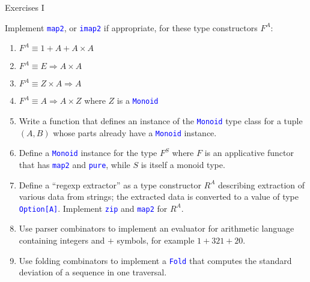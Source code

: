 \documentclass[english]{beamer}
\begin{document}
\begin{frame}{Exercises I }

Implement \texttt{\textcolor{blue}{\footnotesize{}map2}}, or \texttt{\textcolor{blue}{\footnotesize{}imap2}}
if appropriate, for these type constructors $F^{A}$:
\begin{enumerate}
\item $F^{A}\equiv1+A+A\times A$
\item $F^{A}\equiv E\Rightarrow A\times A$
\item $F^{A}\equiv Z\times A\Rightarrow A$ 
\item $F^{A}\equiv A\Rightarrow A\times Z$ where $Z$ is a \texttt{\textcolor{blue}{\footnotesize{}Monoid}} 
\item Write a function that defines an instance of the \texttt{\textcolor{blue}{\footnotesize{}Monoid}}
type class for a tuple $\left(A,B\right)$ whose parts already have
a \texttt{\textcolor{blue}{\footnotesize{}Monoid}} instance.
\item Define a \texttt{\textcolor{blue}{\footnotesize{}Monoid}} instance
for the type $F^{S}$ where $F$ is an applicative functor that has
\texttt{\textcolor{blue}{\footnotesize{}map2}} and \texttt{\textcolor{blue}{\footnotesize{}pure}},
while $S$ is itself a monoid type.
\item Define a ``regexp extractor'' as a type constructor $R^{A}$ describing
extraction of various data from strings; the extracted data is converted
to a value of type \texttt{\textcolor{blue}{\footnotesize{}Option{[}A{]}}}.
Implement \texttt{\textcolor{blue}{\footnotesize{}zip}} and \texttt{\textcolor{blue}{\footnotesize{}map2}}
for $R^{A}$.
\item Use parser combinators to implement an evaluator for arithmetic language
containing integers and $+$ symbols, for example $1+321+20$.
\item Use folding combinators to implement a \texttt{\textcolor{blue}{\footnotesize{}Fold}}
that computes the standard deviation of a sequence in one traversal.
\end{enumerate}
\end{frame}
\end{document}
